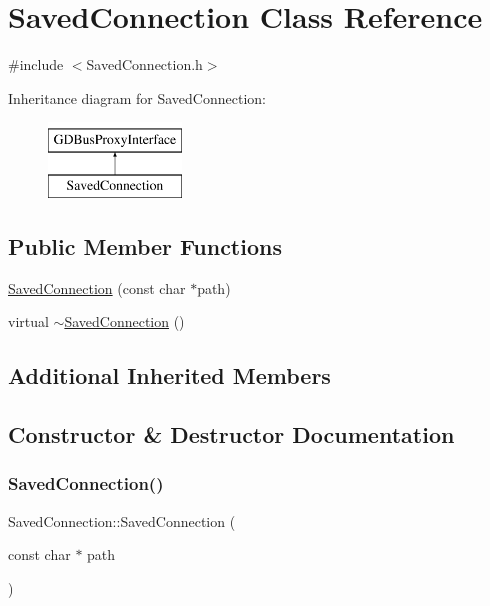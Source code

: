\hypertarget{classSavedConnection}{}\section{Saved\+Connection Class Reference}
\label{classSavedConnection}


{\ttfamily \#include $<$Saved\+Connection.\+h$>$}

Inheritance diagram for Saved\+Connection\+:\begin{figure}[H]
\begin{center}
\leavevmode
\includegraphics[height=2.000000cm]{classSavedConnection}
\end{center}
\end{figure}
\subsection*{Public Member Functions}
\begin{DoxyCompactItemize}
\item 
\mbox{\hyperlink{classSavedConnection_a9d392b9ad22ae74dc1905f01e47e4944}{Saved\+Connection}} (const char $\ast$path)
\item 
virtual \mbox{\hyperlink{classSavedConnection_adb7138dd927d3bbb7b184b666ef1d50c}{$\sim$\+Saved\+Connection}} ()
\end{DoxyCompactItemize}
\subsection*{Additional Inherited Members}


\subsection{Constructor \& Destructor Documentation}
\mbox{\label{classSavedConnection_a9d392b9ad22ae74dc1905f01e47e4944}} 
\subsubsection{\texorpdfstring{Saved\+Connection()}{SavedConnection()}}
{\footnotesize\ttfamily Saved\+Connection\+::\+Saved\+Connection (\begin{DoxyParamCaption}\item[{const char $\ast$}]{path }\end{DoxyParamCaption})}

